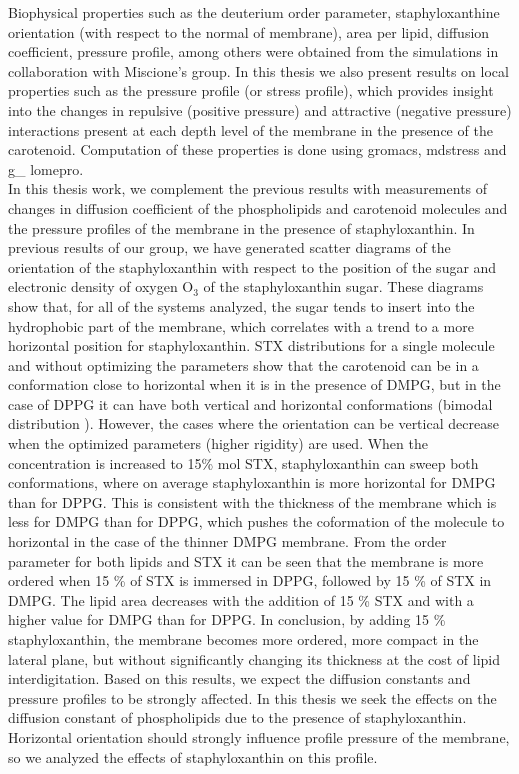 Biophysical properties such as the deuterium order parameter, staphyloxanthine orientation (with respect to the normal of membrane), area per lipid, diffusion coefficient, pressure profile, among others were obtained from the simulations in collaboration with Miscione's group. In this thesis we also present results on local properties such as the pressure profile (or stress profile), which provides insight into the changes in repulsive (positive pressure) and attractive (negative pressure) interactions present at each depth level of the membrane in the presence of the carotenoid. Computation of these properties is done using gromacs, mdstress and g\_ lomepro. \\
In this thesis work, we complement the previous results with measurements of changes in diffusion coefficient of the phospholipids and carotenoid molecules and the pressure profiles of the membrane in the presence of staphyloxanthin. In previous results of our group, we have generated scatter diagrams of the orientation of the staphyloxanthin with respect to the position of the sugar and electronic density of oxygen $ \mathrm{O} _3$ of the staphyloxanthin sugar. These diagrams show that, for all of the systems analyzed, the sugar tends to insert into the hydrophobic part of the membrane, which correlates with a trend to a more horizontal position for staphyloxanthin. STX distributions for a single molecule and without optimizing the parameters show that the carotenoid can be in a conformation close to horizontal when it is in the presence of DMPG, but in the case of DPPG it can have both vertical and horizontal conformations (bimodal distribution ). However, the cases where the orientation can be vertical decrease when the optimized parameters (higher rigidity) are used. When the concentration is increased to 15\% mol STX, staphyloxanthin can sweep both conformations, where on average staphyloxanthin is more horizontal for DMPG than for DPPG. This is consistent with the thickness of the membrane which is less for DMPG than for DPPG, which pushes the coformation of the molecule to horizontal in the case of the thinner DMPG membrane. From the order parameter for both lipids and STX it can be seen that the membrane is more ordered when 15 \% of STX is immersed in DPPG, followed by 15 \% of STX in DMPG. The lipid area decreases with the addition of 15 \% STX and with a higher value for DMPG than for DPPG. In conclusion, by adding 15 \% staphyloxanthin, the membrane becomes more ordered, more compact in the lateral plane, but without significantly changing its thickness at the cost of lipid interdigitation. Based on this results, we expect the diffusion constants and pressure profiles to be strongly affected. In this thesis we seek the effects on the diffusion constant of phospholipids due to the presence of staphyloxanthin. Horizontal orientation should strongly influence profile pressure of the membrane, so we analyzed the effects of staphyloxanthin on this profile. \\[2.0cm]
